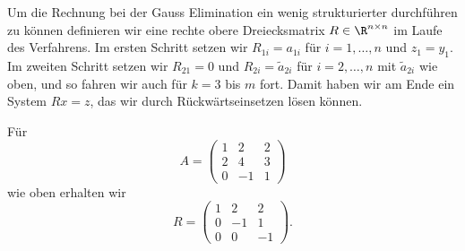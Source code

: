 \documentclass[letterpaper,10pt,english]{jupyterBook}
\begin{document}
Um die Rechnung bei der Gauss Elimination ein wenig strukturierter durchführen zu können definieren wir eine rechte obere Dreiecksmatrix \(R \in \R^{n \times n}\) im Laufe des Verfahrens. Im ersten Schritt setzen wir \(R_{1i}=a_{1i}\) für \(i=1,\ldots,n\) und \(z_1=y_1\). Im zweiten Schritt setzen wir \(R_{21} =0\) und \(R_{2i} = \tilde a_{2i}\) für \(i=2, \ldots,n\) mit \(\tilde a_{2i}\) wie oben, und so fahren wir auch für \(k=3\) bis \(m\) fort. Damit haben wir am Ende ein System \(Rx=z\), das wir durch Rückwärtseinsetzen lösen können.
\label{vektorraeume/LGS:example-21}
\begin{example}{}{}



Für
\begin{equation*}
 A = \left( \begin{matrix} 1 & 2 & 2 \\ 2 & 4 & 3 \\ 0 & -1 & 1 \end{matrix} \right)
\end{equation*}
wie oben erhalten wir
\begin{equation*}
 R = \left( \begin{matrix} 1 & 2 & 2 \\ 0 & -1 & 1 \\ 0 & 0 & -1 \end{matrix} \right).
\end{equation*}\end{example}
\end{document}
